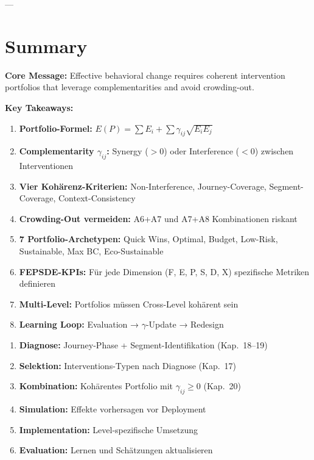 ---

\section{Summary}
\label{sec:20-summary}

\begin{tcolorbox}[colback=green!10!white, colframe=green!75!black,
    title=Key Points]

\textbf{Core Message:} Effective behavioral change requires coherent intervention portfolios that leverage complementarities and avoid crowding-out.

\textbf{Key Takeaways:}
\begin{enumerate}
\item \textbf{Portfolio-Formel:} $E(P) = \sum E_i + \sum \gamma_{ij} \sqrt{E_i E_j}$
\item \textbf{Complementarity $\gamma_{ij}$:} Synergy ($>0$) oder Interference ($<0$) zwischen Interventionen
\item \textbf{Vier Kohärenz-Kriterien:} Non-Interference, Journey-Coverage, Segment-Coverage, Context-Consistency
\item \textbf{Crowding-Out vermeiden:} A6+A7 und A7+A8 Kombinationen riskant
\item \textbf{7 Portfolio-Archetypen:} Quick Wins, Optimal, Budget, Low-Risk, Sustainable, Max BC, Eco-Sustainable
\item \textbf{FEPSDE-KPIs:} Für jede Dimension (F, E, P, S, D, X) spezifische Metriken definieren
\item \textbf{Multi-Level:} Portfolios müssen Cross-Level kohärent sein
\item \textbf{Learning Loop:} Evaluation → $\gamma$-Update → Redesign
\end{enumerate}

\end{tcolorbox}

\begin{tcolorbox}[colback=blue!5!white, colframe=blue!75!black,
    title=Der Vollständige Interventions-Design-Prozess]
\begin{enumerate}[nosep]
\item \textbf{Diagnose:} Journey-Phase + Segment-Identifikation (Kap.\ 18--19)
\item \textbf{Selektion:} Interventions-Typen nach Diagnose (Kap.\ 17)
\item \textbf{Kombination:} Kohärentes Portfolio mit $\gamma_{ij} \geq 0$ (Kap.\ 20)
\item \textbf{Simulation:} Effekte vorhersagen vor Deployment
\item \textbf{Implementation:} Level-spezifische Umsetzung
\item \textbf{Evaluation:} Lernen und Schätzungen aktualisieren
\end{enumerate}
\end{tcolorbox}

